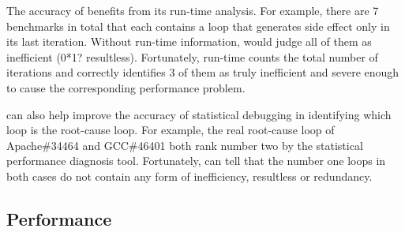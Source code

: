 The accuracy of \Tool benefits from its run-time analysis.
For example, there are 7 benchmarks in total that each contains
a loop that generates side effect only
in its last iteration. Without run-time information, \Tool would judge
all of them as inefficient (0*1? resultless). Fortunately,
\Tool run-time counts the total number of iterations and
correctly identifies 3 of them as truly inefficient and severe enough
to cause the corresponding performance problem.

\Tool can also help improve the accuracy of statistical debugging in
identifying which loop is the root-cause loop.
For example, the real root-cause loop of Apache\#34464 and GCC\#46401 both
rank number two by the statistical performance diagnosis tool.
Fortunately,
\Tool can tell that the number one loops in both cases do not contain
any form of inefficiency, resultless or redundancy. 

\subsection{Performance}
\label{sec:result_perf}

